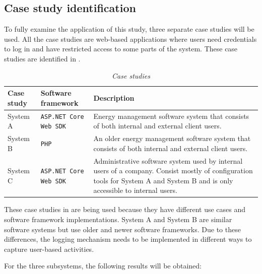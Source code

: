 \subsection{Case study identification}
To fully examine the application of this study, three separate case studies will be used. All the case studies are web-based applications where users need credentials to log in and have restricted access to some parts of the system. These case studies are identified in .

\begin{table}[!htb]
	\centering
	\caption[Case studies]
	{\textit{Case studies}}
	\label{tbl:ch3_caseStudies}
	\begin{tabularx}{\textwidth}{|X|X|X|}
		\hline \textbf{Case study} & \textbf{Software framework} & \textbf{Description} \\
		\hline System A & \texttt{ASP.NET Core Web SDK} & \RaggedRight Energy management software system that consists of both internal and external client users. \\
		\hline System B & \texttt{PHP} & \RaggedRight An older energy management software system that consists of both internal and external client users. \\
		\hline System C & \texttt{ASP.NET Core Web SDK} & \RaggedRight Administrative software system used by internal users of a company. Consist mostly of configuration tools for System A and System B and is only accessible to internal users. \\
		\hline
	\end{tabularx}
\end{table}

These case studies in  are being used because they have different use cases and software framework implementations. System A and System B are similar software systems but use older and newer software frameworks. Due to these differences, the logging mechanism needs to be implemented in different ways to capture user-based activities.\par For the three subsystems, the following results will be obtained:

